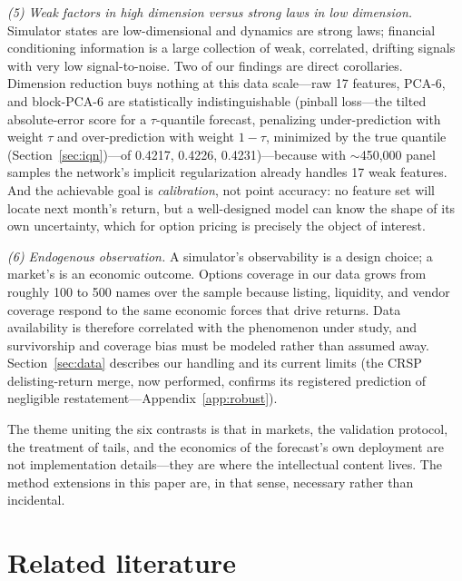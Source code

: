 \documentclass[11pt]{article}
\begin{document}
\emph{(5) Weak factors in high dimension versus strong laws in low dimension.} Simulator states are low-dimensional and dynamics are strong laws; financial conditioning information is a large collection of weak, correlated, drifting signals with very low signal-to-noise. Two of our findings are direct corollaries. Dimension reduction buys nothing at this data scale---raw 17 features, PCA-6, and block-PCA-6 are statistically indistinguishable (pinball loss---the tilted absolute-error score for a $\tau$-quantile forecast, penalizing under-prediction with weight $\tau$ and over-prediction with weight $1-\tau$, minimized by the true quantile (Section~\ref{sec:iqn})---of 0.4217, 0.4226, 0.4231)---because with $\sim$450{,}000 panel samples the network's implicit regularization already handles 17 weak features. And the achievable goal is \emph{calibration}, not point accuracy: no feature set will locate next month's return, but a well-designed model can know the shape of its own uncertainty, which for option pricing is precisely the object of interest.

\emph{(6) Endogenous observation.} A simulator's observability is a design choice; a market's is an economic outcome. Options coverage in our data grows from roughly 100 to 500 names over the sample because listing, liquidity, and vendor coverage respond to the same economic forces that drive returns. Data availability is therefore correlated with the phenomenon under study, and survivorship and coverage bias must be modeled rather than assumed away. Section~\ref{sec:data} describes our handling and its current limits (the CRSP delisting-return merge, now performed, confirms its registered prediction of negligible restatement---Appendix~\ref{app:robust}).

The theme uniting the six contrasts is that in markets, the validation protocol, the treatment of tails, and the economics of the forecast's own deployment are not implementation details---they are where the intellectual content lives. The method extensions in this paper are, in that sense, necessary rather than incidental.

\section{Related literature}\label{sec:literature}
\end{document}
